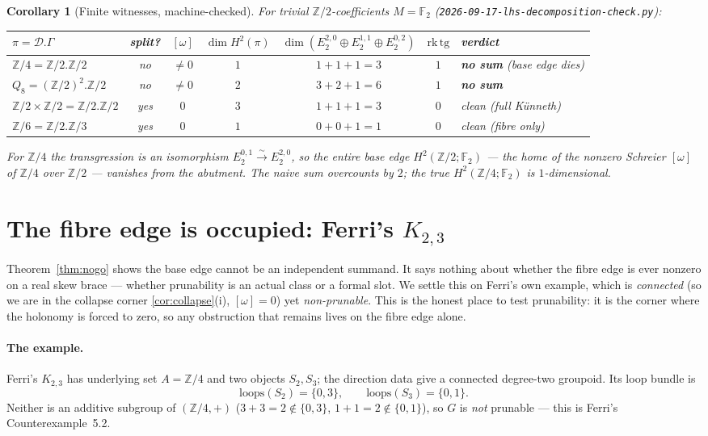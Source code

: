 \documentclass[11pt]{article}
\newtheorem{corollary}[theorem]{Corollary}
\theoremstyle{definition}
\newcommand{\D}{\mathcal{D}}
\newcommand{\Z}{\mathbb{Z}}
\newcommand{\tg}{\mathrm{tg}}
\newcommand{\loops}{\mathrm{loops}}
\begin{document}
\begin{corollary}[Finite witnesses, machine-checked]\label{cor:witness}
For trivial $\Z/2$-coefficients $M=\mathbb F_2$
(\texttt{2026-09-17-lhs-}\allowbreak\texttt{decomposition-check.py}):
\begin{center}\footnotesize\setlength{\tabcolsep}{4pt}
\begin{tabular}{lcccccl}
\toprule
$\pi=\D.\Gamma$ & split? & $[\omega]$ & $\dim H^2(\pi)$ &
$\dim(E_2^{2,0}\!\oplus\!E_2^{1,1}\!\oplus\!E_2^{0,2})$ & $\mathrm{rk}\,\tg$ & verdict\\
\midrule
$\Z/4=\Z/2.\Z/2$          & no  & $\neq0$ & $1$ & $1{+}1{+}1=3$ & $1$ & \textbf{no sum} (base edge dies)\\
$Q_8=(\Z/2)^2.\Z/2$       & no  & $\neq0$ & $2$ & $3{+}2{+}1=6$ & $1$ & \textbf{no sum}\\
$\Z/2\times\Z/2=\Z/2.\Z/2$& yes & $0$     & $3$ & $1{+}1{+}1=3$ & $0$ & clean (full K\"unneth)\\
$\Z/6=\Z/2.\Z/3$          & yes & $0$     & $1$ & $0{+}0{+}1=1$ & $0$ & clean (fibre only)\\
\bottomrule
\end{tabular}
\end{center}
For $\Z/4$ the transgression is an isomorphism $E_2^{0,1}\xrightarrow{\sim}E_2^{2,0}$, so the
entire base edge $H^2(\Z/2;\mathbb F_2)$ --- the home of the nonzero Schreier $[\omega]$ of
$\Z/4$ over $\Z/2$ \cite{gzs} --- \emph{vanishes} from the abutment. The naive sum overcounts
by $2$; the true $H^2(\Z/4;\mathbb F_2)$ is $1$-dimensional.
\end{corollary}

\section{The fibre edge is occupied: Ferri's \texorpdfstring{$K_{2,3}$}{K23}}\label{sec:k23}

Theorem~\ref{thm:nogo} shows the base edge cannot be an independent summand. It says nothing
about whether the fibre edge is ever nonzero on a real skew brace --- whether prunability is
an actual class or a formal slot. We settle this on Ferri's own example, which is
\emph{connected} (so we are in the collapse corner \ref{cor:collapse}(i), $[\omega]=0$) yet
\emph{non-prunable}. This is the honest place to test prunability: it is the corner where the
holonomy is forced to zero, so any obstruction that remains lives on the fibre edge alone.

\paragraph{The example.} Ferri's $K_{2,3}$ \cite[Ex.~4.29, Table~3]{ferri} has underlying set
$A=\Z/4$ and two objects $S_2,S_3$; the direction data give a connected degree-two groupoid.
Its loop bundle is
\[
   \loops(S_2)=\{0,3\},\qquad \loops(S_3)=\{0,1\}.
\]
Neither is an additive subgroup of $(\Z/4,+)$ ($3+3=2\notin\{0,3\}$, $1+1=2\notin\{0,1\}$),
so $G$ is \emph{not} prunable --- this is Ferri's Counterexample~5.2.
\end{document}
